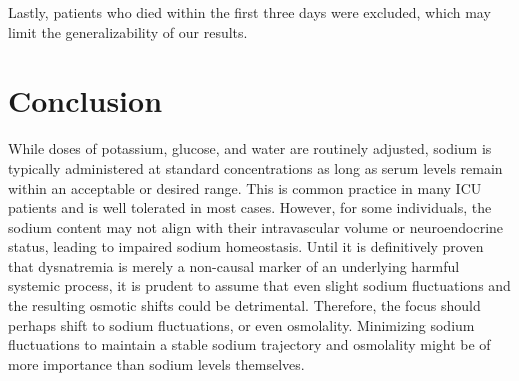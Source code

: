 Lastly, patients who died within the first three days were excluded, which may limit the generalizability of our results.


\section{Conclusion}
While doses of potassium, glucose, and water are routinely adjusted, sodium is typically administered at standard concentrations as long as serum levels remain within an acceptable or desired range. This is common practice in many ICU patients and is well tolerated in most cases. However, for some individuals, the sodium content may not align with their intravascular volume or neuroendocrine status, leading to impaired sodium homeostasis. Until it is definitively proven that dysnatremia is merely a non-causal marker of an underlying harmful systemic process, it is prudent to assume that even slight sodium fluctuations and the resulting osmotic shifts could be detrimental. Therefore, the focus should perhaps shift to sodium fluctuations, or even osmolality. Minimizing sodium fluctuations to maintain a stable sodium trajectory and osmolality might be of more importance than sodium levels themselves.





